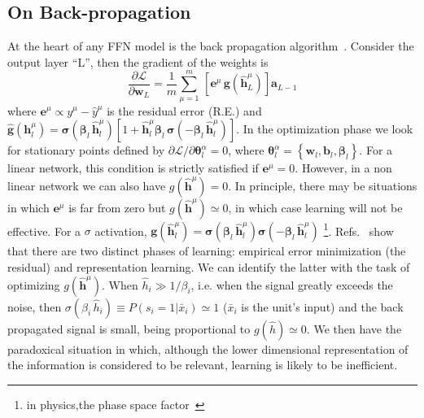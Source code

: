 \documentclass{article}
\begin{document}
\subsection{On Back-propagation} \label{sub:back}
At the heart of any FFN model is the back propagation algorithm~\cite{hertz, bishop}. Consider the output layer ``L'', then the gradient of the weights is
%
\begin{equation} \label{eq:gradsL}
\frac{\partial \mathscr{L}}{\partial \mathbf{w}_L } =  \frac{1}{m} \sum_{\mu=1}^m \, \left[ \mathbf{e}^{\mu} \, \mathbf{g}(\hat{\mathbf{h}}^{\mu} _L) \right]  \mathbf{a}_{L-1}
 \end{equation}
%
where $\mathbf{e}^{\mu}\propto y^{\mu} - \hat{y}^{\mu}$ is the residual error (R.E.) and $\hat{\mathbf{g}}(\mathbf{h}^{\mu}_l) =  \boldsymbol{\sigma}(\boldsymbol{\beta}_l \, \hat{\mathbf{h}}^{\mu}_l)[ 1 + \hat{\mathbf{h}}^{\mu}_l \boldsymbol{\beta}_l \, \boldsymbol{\sigma}(-\boldsymbol{\beta}_l \, \hat{\mathbf{h}}^{\mu}_l) ] $. In the optimization phase we look for stationary points defined by $\partial \mathscr{L}/\partial \boldsymbol{\theta}^{\alpha}_l=0$, where $\boldsymbol{\theta}^{\alpha}_l = \left\{ \mathbf{w}_l, \mathbf{b}_l, \boldsymbol{\beta}_l \right\} $. For a linear network, this condition is  strictly satisfied if $ \mathbf{e}^{\mu}=0$. However, in a non linear network we can also have $g(\hat{\mathbf{h}}^{\mu})=0$. In principle, there may be situations in which $\mathbf{e}^{\mu}$ is far from zero but $g(\hat{\mathbf{h}}^{\mu}) \simeq 0$, in which case learning will not be effective. For a $\sigma$ activation, $\mathbf{g}(\hat{\mathbf{h}}^{\mu}_l) = \boldsymbol{\sigma}(\boldsymbol{\beta}_l \, \hat{\mathbf{h}}^{\mu}_l)\boldsymbol{\sigma}(-\boldsymbol{\beta}_l \, \hat{\mathbf{h}}^{\mu}_l)$ \footnote{in physics,the phase space factor~\cite{roberto}}.%
 Refs.~\cite{tishby1, tishby2} show that there are two distinct phases of learning: empirical error minimization (the residual) and representation learning. We can identify the latter with the task of optimizing $g(\hat{\mathbf{h}}^{\mu})$. When $\hat{h}_i \gg 1/\beta_i$, i.e. when the signal greatly exceeds the noise, then $\sigma( \beta_i \,\hat{ h}_i) \equiv P(s_i=1| \bar{x}_i)  \simeq 1$ ($\bar{x}_i$ is the unit's input) and the back propagated signal is small, being proportional to $g(\hat{h} ) \simeq 0$. We then have the paradoxical situation in which, although the lower dimensional representation of the information is considered to be relevant, learning is likely to be inefficient.
\end{document}
